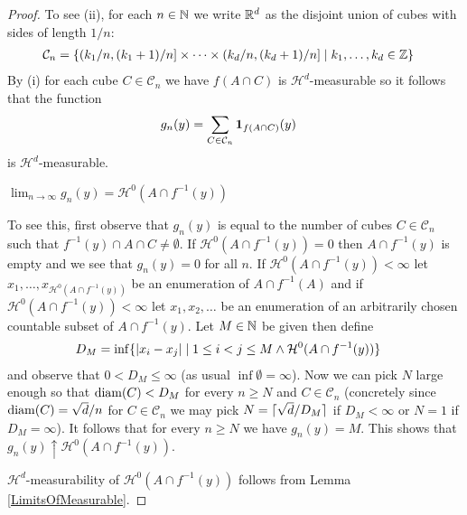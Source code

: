 \begin{proof}
To see (ii), for each $n \in \mathbb{N}$ we write $\mathbb{R}^d$ as the disjoint union of cubes with sides of length $1/n$:
\begin{align*}
\mathcal{C}_n &= \lbrace (k_1/n, (k_1+1)/n] \times \dotsb \times (k_d/n, (k_d+1)/n] \mid k_1, \dotsc, k_d \in \mathbb{Z} \rbrace
\end{align*}
By (i) for each cube $C \in \mathcal{C}_n$ we have $f(A \cap C)$ is $\mathcal{H}^d$-measurable so it follows that the function
\begin{align*}
g_n(y)  &= \sum_{C \in \mathcal{C}_n} \textbf{1}_{f(A \cap C)}(y)
\end{align*}
is $\mathcal{H}^d$-measurable.  
\begin{clm} $\lim_{n \to \infty} g_n(y) = \mathcal{H}^0( A \cap f^{-1} (y))$
\end{clm}
To see this, first observe that $g_n(y)$ is equal to the number of cubes $C \in \mathcal{C}_n$ such that $f^{-1}(y) \cap A \cap C \neq \emptyset$.  If $\mathcal{H}^0( A \cap f^{-1} (y))=0$ then $A \cap f^{-1} (y)$ is empty and we see that $g_n(y)=0$ for all $n$.  If $\mathcal{H}^0( A \cap f^{-1} (y)) < \infty$ let $x_1, \dotsc, x_{\mathcal{H}^0( A \cap f^{-1} (y)) }$ be an enumeration of $A \cap f^{-1}(A)$ and if $\mathcal{H}^0( A \cap f^{-1} (y)) < \infty$ let $x_1, x_2, \dotsc$ be an enumeration of an arbitrarily chosen countable subset of $A \cap f^{-1} (y)$.  Let $M \in \mathbb{N}$ be given then define
\begin{align*}
D_M &= \inf \lbrace \left \vert x_i-x_j \right \vert  \mid  1 \leq i < j \leq M \wedge \mathcal{H}^0( A \cap f^{-1} (y)) \rbrace
\end{align*} 
and observe that $0 < D_M \leq \infty$ (as usual $\inf \emptyset = \infty$).  Now we can pick $N$ large enough so that $\operatorname*{diam}(C) < D_M$ for every $n \geq N$ and $C \in \mathcal{C}_n$ (concretely since $\operatorname*{diam}(C) = \sqrt{d}/n$ for $C \in \mathcal{C}_n$ we may pick $N = \lceil \sqrt{d}/ D_M \rceil$ if $D_M<\infty$ or $N=1$ if $D_M=\infty$).  It follows that for every $n \geq N$ we have $g_n(y) = M$.  This shows that $g_n(y) \uparrow \mathcal{H}^0( A \cap f^{-1} (y))$.  

$\mathcal{H}^d$-measurability of $\mathcal{H}^0( A \cap f^{-1} (y))$ follows from Lemma \ref{LimitsOfMeasurable}.


\end{proof}
